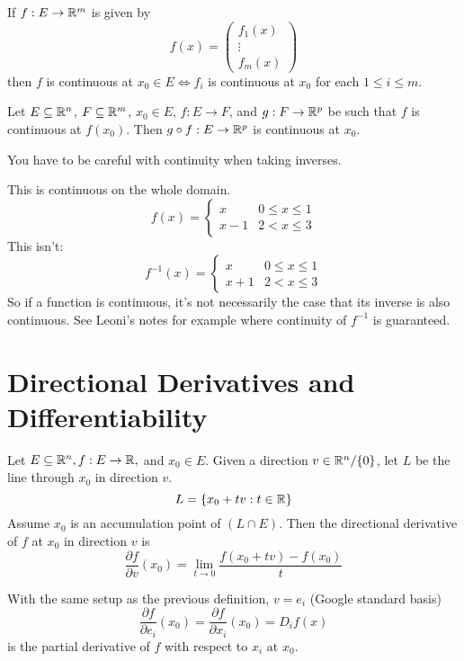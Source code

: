 \documentclass[11pt]{article}
\newcommand{\ra}{\rightarrow}
\newcommand{\sse}{\subseteq}
\begin{document}
\begin{remark}
    If $f: E \ra \R^m$ is given by \[f(x) = \begin{pmatrix}
        f_1(x) \\
        \vdots \\
        f_m(x)
    \end{pmatrix}\]
    then $f$ is continuous at $x_0 \in E \iff f_i$ is continuous at $x_0$ for each $1 \leq i \leq m$. 
\end{remark}

\begin{theorem}
    Let $E \subseteq \mathbb{R}^n$, $F \sse \R^m$, $x_0 \in E$, $f: E \ra F$, and $g: F \ra \R^p$ be such that $f$ is continuous at $f(x_0)$. Then $g \circ f: E \ra \R^p$ is continuous at $x_0$.
\end{theorem}

You have to be careful with continuity when taking inverses.
\begin{example}
    This is continuous on the whole domain.
    \[f(x) = \begin{cases} 
        x & 0 \leq x \leq 1 \\
        x-1 & 2 < x \leq 3 
     \end{cases}
    \]
    This isn't:
    \[f^{-1}(x) = \begin{cases} 
        x & 0 \leq x \leq 1 \\
        x+1 & 2 < x \leq 3 
     \end{cases}
    \]
    So if a function is continuous, it's not necessarily the case that its inverse is also continuous. See Leoni's notes for example where continuity of $f^{-1}$ is guaranteed. 
\end{example} 
\section{Directional Derivatives and Differentiability}
\begin{definition}
    Let $E \sse \R^n, f: E \ra \R,$ and  $x_0 \in E$. Given a direction $v \in \mathbb{R}^n/\{0\}$, let $L$ be the line through $x_0$ in direction $v$.
    \[L = \{x_0 + tv: t \in \mathbb{R}\}\]
    Assume $x_0$ is an accumulation point of $(L \cap E)$. Then the directional derivative of $f$ at $x_0$ in direction $v$ is 
    \[\frac{\partial f}{\partial v}(x_0) = \lim_{t \ra 0} \frac{f(x_0 + tv) - f(x_0)}{t}\]
\end{definition}


\begin{definition}
    With the same setup as the previous definition, $v = e_i$ (Google standard basis)
    \[\frac{\partial f}{\partial e_i} (x_0) = \frac{\partial f}{\partial x_i} (x_0)= D_if(x)\]
    is the partial derivative of $f$ with respect to $x_i$ at $x_0$. 
\end{definition}
\end{document}

